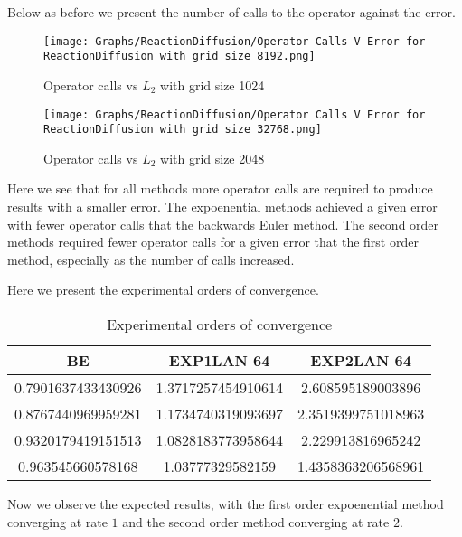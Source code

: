 Below as before we present the number of calls to the operator against the error.
\begin{figure}[H]
    \centering
    \begin{minipage}{0.49\textwidth}
        \texttt{[image: Graphs/ReactionDiffusion/Operator Calls V Error for ReactionDiffusion with grid size 8192.png]} %
        \caption{Operator calls vs $L_2$ with grid size 1024}
        \label{fig:plot1}
    \end{minipage}\hfill
    \centering
    \begin{minipage}{0.49\textwidth}
        \texttt{[image: Graphs/ReactionDiffusion/Operator Calls V Error for ReactionDiffusion with grid size 32768.png]} %
        \caption{Operator calls vs $L_2$ with grid size 2048}
        \label{fig:plot2}
    \end{minipage}\hfill
\end{figure}
Here we see that for all methods more operator calls are required to produce results with a smaller error.
The expoenential methods achieved a given error with fewer operator calls that the backwards Euler method.
The second order methods required fewer operator calls for a given error that the first order method, especially as the number of calls increased.


Here we present the experimental orders of convergence.
\begin{table}[H]
    \centering
    \begin{tabular}{| c | c | c |}
    \hline
    BE & EXP1LAN 64 & EXP2LAN 64 \\
    \hline
    0.7901637433430926 & 1.3717257454910614    & 2.608595189003896 \\
    0.8767440969959281 & 1.1734740319093697    & 2.3519399751018963 \\
    0.9320179419151513 & 1.0828183773958644   & 2.229913816965242\\
    0.963545660578168  & 1.03777329582159   & 1.4358363206568961 \\
    \hline
    \end{tabular}
    \caption{Experimental orders of convergence}
    \label{tab:reduced_data}
\end{table}

Now we observe the expected results, with the first order expoenential method converging at rate $1$ and the second order method converging at rate $2$.